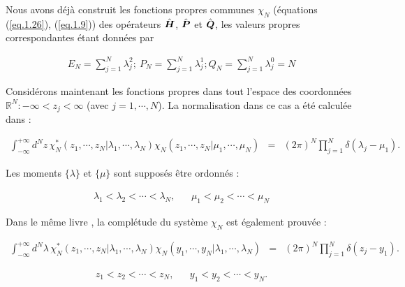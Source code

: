 Nous avons déjà construit les fonctions propres communes $\chi_N$ (équations (\ref{eq.1.26}), (\ref{eq.1.9})) des opérateurs $\hat{\bm{H}}$, $\hat{\bm{P}}$ et $\hat{\bm{Q}}$, les valeurs propres correspondantes étant données par

\begin{eqnarray}
	E_N = \sum_{j = 1 }^N \lambda_j^2 ; ~ 	P_N = \sum_{j = 1 }^N \lambda_j^1 ; Q_N = \sum_{j = 1 }^N \lambda_j^0 = N 
\end{eqnarray}

Considérons maintenant les fonctions propres dans tout l'espace des coordonnées $\mathbb{R}^N : -\infty < z_j < \infty$ (avec $j = 1, \cdots, N$). La normalisation dans ce cas a été calculée dans \cite{g} :

\begin{eqnarray}
	\int_{-\infty}^{+\infty} d^N z \, \chi_N^\ast ( z_1 , \cdots , z_N \vert \lambda_1 , \cdots , \lambda_N ) \chi_N ( z_1 , \cdots , z_N \vert \mu_1 , \cdots , \mu_N ) & = & ( 2 \pi )^N 	\prod_{ j = 1 }^N \delta ( \lambda_j - \mu _1 ).
\end{eqnarray}

Les moments \(\{ \lambda \}\) et \(\{\mu\}\) sont supposés être ordonnés :

\begin{eqnarray}
	\lambda_1 < \lambda_2 < \cdots < \lambda_N , && 		\mu_1 < \mu_2 < \cdots < \mu_N 
\end{eqnarray}

Dans le même livre \cite{9}, la complétude du système \(\chi_N\) est également prouvée :

\begin{eqnarray}
	\int_{-\infty}^{+\infty} d^N \lambda \, \chi_N^\ast ( z_1 , \cdots , z_N \vert \lambda_1 , \cdots , \lambda_N ) \chi_N ( y_1 , \cdots , y_N \vert \lambda_1 , \cdots , \lambda_N ) & = & ( 2 \pi )^N 	\prod_{ j = 1 }^N \delta ( z_j - y_1 ).
\end{eqnarray}

\begin{eqnarray}
	z_1 < z_2 < \cdots < z_N , && 		y_1 < y_2 < \cdots < y_N .
\end{eqnarray}